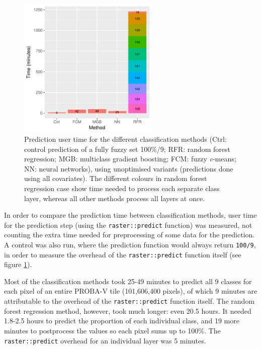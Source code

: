 \documentclass[a4paper,12pt]{scrbook}
\begin{document}
\begin{figure}
  \centering
  \includegraphics[width=0.6\textwidth]{thesis-figures/timing}
  \caption{Prediction user time for the different classification methods (Ctrl: control prediction of a fully fuzzy set 100\%/9; RFR: random forest regression; MGB: multiclass gradient boosting; FCM: fuzzy \textit{c}-means; NN: neural networks), using unoptimised variants (predictions done using all covariates). The different colours in random forest regression case show time needed to process each separate class layer, whereas all other methods process all layers at once.}
  \label{fig-timing}
\end{figure}

In order to compare the prediction time between classification methods, user time for the prediction step (using the \texttt{raster::predict} function) was measured, not counting the extra time needed for preprocessing of some data for the prediction. A control was also run, where the prediction function would always return \texttt{100/9}, in order to measure the overhead of the \texttt{raster::predict} function itself (see figure \ref{fig-timing}).

Most of the classification methods took 25-49 minutes to predict all 9 classes for each pixel of an entire PROBA-V tile (101,606,400 pixels), of which 9 minutes are attributable to the overhead of the \texttt{raster::predict} function itself. The random forest regression method, however, took much longer: even 20.5 hours. It needed 1.8-2.5 hours to predict the proportion of each individual class, and 19 more minutes to postprocess the values so each pixel sums up to 100\%. The \texttt{raster::predict} overhead for an individual layer was 5 minutes.
\end{document}

